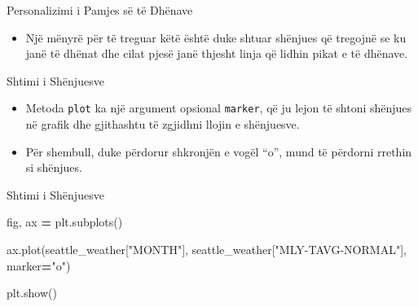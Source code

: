 \documentclass[
  ignorenonframetext,
]{beamer}
\newenvironment{Shaded}{\begin{snugshade}}{\end{snugshade}}
\newcommand{\NormalTok}[1]{#1}
\newcommand{\OperatorTok}[1]{\textcolor[rgb]{0.81,0.36,0.00}{\textbf{#1}}}
\newcommand{\StringTok}[1]{\textcolor[rgb]{0.31,0.60,0.02}{#1}}
\providecommand{\tightlist}{%
  \setlength{\itemsep}{0pt}\setlength{\parskip}{0pt}}
\begin{document}
\begin{frame}{Personalizimi i Pamjes së të Dhënave}
\protect\hypertarget{personalizimi-i-pamjes-suxeb-tuxeb-dhuxebnave-1}{}
\begin{itemize}
\tightlist
\item
  Një mënyrë për të treguar këtë është duke shtuar shënjues që tregojnë
  se ku janë të dhënat dhe cilat pjesë janë thjesht linja që lidhin
  pikat e të dhënave.
\end{itemize}
\end{frame}

\begin{frame}[fragile]{Shtimi i Shënjuesve}
\protect\hypertarget{shtimi-i-shuxebnjuesve}{}
\begin{itemize}
\item
  Metoda \texttt{plot} ka një argument opsional \texttt{marker}, që ju
  lejon të shtoni shënjues në grafik dhe gjithashtu të zgjidhni llojin e
  shënjuesve.
\item
  Për shembull, duke përdorur shkronjën e vogël ``o'', mund të përdorni
  rrethin si shënjues.
\end{itemize}
\end{frame}

\begin{frame}[fragile]{Shtimi i Shënjuesve}
\protect\hypertarget{shtimi-i-shuxebnjuesve-1}{}

\begin{Shaded}
\begin{Highlighting}[]
\NormalTok{fig, ax }\OperatorTok{=}\NormalTok{ plt.subplots()}

\NormalTok{ax.plot(seattle\_weather[}\StringTok{"MONTH"}\NormalTok{], seattle\_weather[}\StringTok{"MLY{-}TAVG{-}NORMAL"}\NormalTok{],}
\NormalTok{marker}\OperatorTok{=}\StringTok{"o"}\NormalTok{)}

\NormalTok{plt.show()}
\end{Highlighting}
\end{Shaded}
\end{frame}
\end{document}
